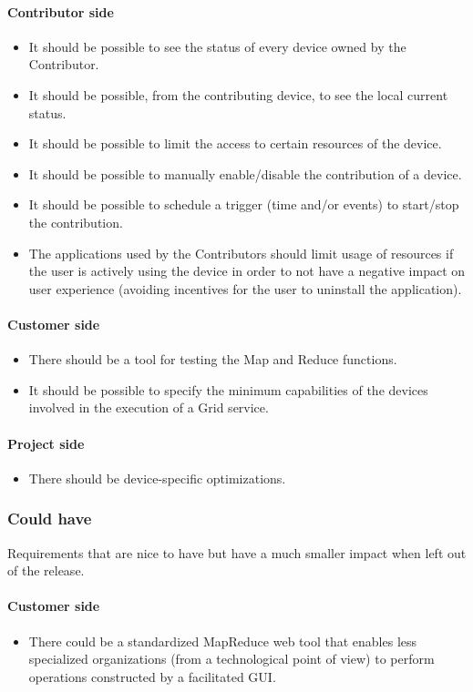 \paragraph{Contributor side}
\begin{itemize}
    \item It should be possible to see the status of every device owned by the Contributor.
    \item It should be possible, from the contributing device, to see the local current status.
    \item It should be possible to limit the access to certain resources of the device.
    \item It should be possible to manually enable/disable the contribution of a device.
    \item It should be possible to schedule a trigger (time and/or events) to start/stop the contribution.
    \item The applications used by the Contributors should limit usage of resources if the user is actively using the device in order to not have a negative impact on user experience (avoiding incentives for the user to uninstall the application).
\end{itemize}
\paragraph{Customer side}
\begin{itemize}
    \item There should be a tool for testing the Map and Reduce functions.
    \item It should be possible to specify the minimum capabilities of the devices involved in the execution of a Grid service.
\end{itemize}
\paragraph{Project side}
\begin{itemize}
    \item There should be device-specific optimizations.
\end{itemize}

\subsubsection{Could have}
Requirements that are nice to have but have a much smaller impact when left out of the release.
\paragraph{Customer side}
\begin{itemize}
    \item There could be a standardized MapReduce web tool that enables less specialized organizations (from a technological point of view) to perform operations constructed by a facilitated GUI.
\end{itemize}